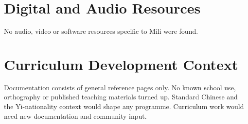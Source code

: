 \documentclass[12pt]{article}
\begin{document}
\section{Digital and Audio Resources}
No audio, video or software resources specific to Mili were found.

\section{Curriculum Development Context}
Documentation consists of general reference pages only. No known school use, orthography or published teaching materials turned up. Standard Chinese and the Yi-nationality context would shape any programme. Curriculum work would need new documentation and community input.
\end{document}
